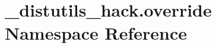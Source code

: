 \hypertarget{namespace__distutils__hack_1_1override}{}\section{\+\_\+distutils\+\_\+hack.\+override Namespace Reference}
\label{namespace__distutils__hack_1_1override}
